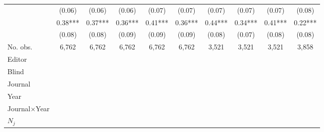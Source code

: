 \begin{table}
\begin{threeparttable}
\begin{tabular}{p{3cm}S@{}S@{}S@{}S@{}S@{}S@{}S@{}S@{}S@{}}
                                          &      (0.06)   &      (0.06)   &      (0.06)   &      (0.07)   &      (0.07)   &      (0.07)   &      (0.07)   &      (0.07)   &      (0.08)   \\
            &        0.38***&        0.37***&        0.36***&        0.41***&        0.36***&        0.44***&        0.34***&        0.41***&        0.22***\\
                                          &      (0.08)   &      (0.08)   &      (0.09)   &      (0.09)   &      (0.09)   &      (0.08)   &      (0.07)   &      (0.08)   &      (0.08)   \\
            \midrule
            No. obs.                      &       6,762   &       6,762   &       6,762   &       6,762   &       6,762   &       3,521   &       3,521   &       3,521   &       3,858   \\
            \midrule
            Editor                &           {}   &           {}   &           {}   &           {}   &           {}   &           {}   &           {}   &           {}   &           {}   \\
            Blind                         &           {}   &           {}   &           {}   &           {}   &           {}   &           {}   &           {}   &           {}   &           {}   \\
            Journal                       &           {}   &           {}   &               &               &               &               &               &               &               \\
            Year                          &               &           {}   &               &               &               &               &               &               &               \\
            Journal\(\times\)Year                  &               &               &           {}   &           {}   &           {}   &           {}   &           {}   &           {}   &           {}   \\
            \(N_j\)                       &               &               &               &           {}   &           {}   &           {}   &           {}   &           {}   &           {}   \\

\end{tabular}
\end{threeparttable}
\end{table}
